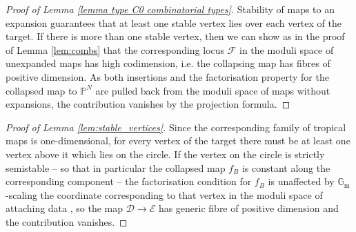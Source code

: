 \documentclass[11pt]{amsart}
\renewcommand{\to}{\rightarrow}
\newcommand{\Gm}{\mathbb{G}_{\text{m}}}
\newcommand{\Dcal}{\mathcal{D}}
\newcommand{\Ecal}{\mathcal{E}}
\newcommand{\Fcal}{\mathcal{F}}
\theoremstyle{definition}
\newtheorem{lemma}[thm]{Lemma}
\theoremstyle{definition}
\begin{document}


\begin{proof}[Proof of Lemma \ref{lemma type C0 combinatorial types}]
Stability of maps to an expansion guarantees that at least one stable vertex lies over each vertex of the target. If there is more than one stable vertex, then we can show as in the proof of Lemma \ref{lem:combs} that the corresponding locus $\Fcal$ in the moduli space of unexpanded maps has high codimension, i.e. the collapsing map has fibres of positive dimension. As both insertions and the factorisation property for the collapsed map to $\mathbb P^N$ are pulled back from the moduli space of maps without expansions, the contribution vanishes by the projection formula.
\end{proof}
\begin{proof}[Proof of Lemma \ref{lem:stable_vertices}]
Since the corresponding family of tropical maps is one-dimensional, for every vertex of the target there must be at least one vertex above it which lies on the circle. If the vertex on the circle is strictly semistable -- so that in particular the collapsed map $f_B$ is constant along the corresponding component -- the factorisation condition for $f_B$ is unaffected by $\Gm$-scaling the coordinate corresponding to that vertex in the moduli space of attaching data \cite[\S 2.2]{SMY2}, so the map $\Dcal\to\Ecal$ has generic fibre of positive dimension and the contribution vanishes.
\end{proof}
\end{document}
